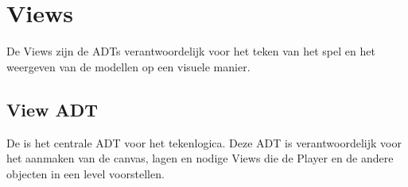 \section{Views}
\label{view}
De Views zijn de ADTs verantwoordelijk voor het teken van het spel en het weergeven van de modellen op een visuele manier.

\subsection{View ADT}
\label{section:view}
De \texttt{} is het centrale ADT voor het tekenlogica.
Deze ADT is verantwoordelijk voor het aanmaken van de canvas, lagen en nodige Views die de Player en de andere objecten in een level voorstellen.

